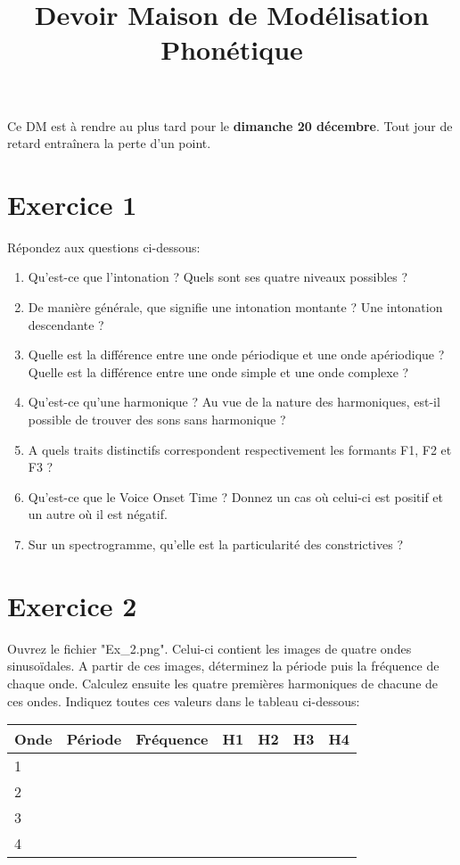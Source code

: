 \documentclass[french]{article}
\title{Devoir Maison de Modélisation Phonétique}
\begin{document}
\maketitle


Ce DM est à rendre au plus tard pour le \textbf{dimanche 20 décembre}. Tout jour de retard entraînera la perte d'un point. 
\section{Exercice 1}

Répondez aux questions ci-dessous:

\begin{enumerate}
	\item Qu’est-ce que l’intonation ? Quels sont ses quatre niveaux possibles ?
	\item  De manière générale, que signifie une intonation montante ? Une intonation descendante ?
\item Quelle est la différence entre une onde périodique et une onde apériodique ? Quelle est la différence entre une onde simple et une onde complexe ? 

	\item Qu'est-ce qu'une harmonique ? Au vue de la nature des harmoniques, est-il possible de trouver des sons sans harmonique ?
	\item A quels traits distinctifs correspondent respectivement les formants F1, F2 et F3 ? 
	\item Qu'est-ce que le Voice Onset Time ? Donnez un cas où celui-ci est positif et un autre où il est négatif.
	\item Sur un spectrogramme, qu'elle est la particularité des constrictives ?
	
	
\end{enumerate}

\section{Exercice 2}

Ouvrez le fichier "Ex\_2.png". Celui-ci contient les images de quatre ondes sinusoïdales. A partir de ces images, déterminez la période puis la fréquence de chaque onde. Calculez ensuite les quatre premières harmoniques de chacune de ces ondes. Indiquez toutes ces valeurs dans le tableau ci-dessous:

\begin{table}[h!]
	\begin{tabular}{|l|l|l|l|l|l|l|}
		\hline
		Onde & Période & Fréquence & H1 & H2 & H3 & H4 \\ \hline
		1 &         &           &    &    &    &    \\ \hline
		2 &         &           &    &    &    &    \\ \hline
		3 &         &           &    &    &    &    \\ \hline
		4 &         &           &    &    &    &    \\ \hline
	\end{tabular}
\end{table}
\end{document}
